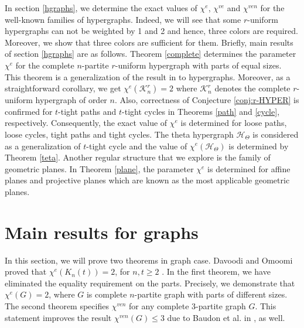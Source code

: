 \documentclass[12pt,a4paper]{article}
\begin{document}
In section \ref{hgraphs}, we determine the exact values of  $\chi^{e}$,  $\chi^{ve}$ and  $\chi^{ven}$ for the well-known  families of hypergraphs.  Indeed, we will see that some  $ r $-uniform hypergraphs can not be weighted by 1 and 2 and hence, three colors are required. Moreover, we show that three colors are sufficient for them.
Briefly,  main results of section  \ref{hgraphs} are as follows. Theorem \ref{complete} determines  the parameter $ \chi^{e}$ for the complete $ n$-partite $ r$-uniform hypergraph with parts of equal sizes. This theorem is a generalization of the result in \cite{DO} to hypergraphs. Moreover, as a straightforward corollary, we get $ \chi^{e}(\mathcal{K}_n^r)=2 $ where $\mathcal{K}_n^r$ denotes the complete  $ r$-uniform hypergraph of order $n$.
Also, correctness of Conjecture \ref{conj:r-HYPER} is confirmed for $t$-tight paths and $t$-tight cycles in Theorems \ref{path} and \ref{cycle}, respectively. Consequently, the exact value of $\chi^{e}$ is determined for loose paths, loose cycles, tight paths and tight cycles.
The theta hypergraph $\mathcal{H}_{\Theta}$ is considered as a generalization of $t$-tight cycle and the value of $\chi^{e}(\mathcal{H}_{\Theta})$ is determined by Theorem \ref{teta}.
Another regular structure that we explore is the family of geometric planes.  In Theorem \ref{plane}, the parameter $\chi^{e}$ is determined  for affine planes and projective planes which are known as the most applicable geometric planes.

\section{Main results for graphs\label{graph}}
In this section, we will prove two theorems in graph case.
Davoodi and Omoomi proved that $ \chi^{e}(K_n(t)) =2$, for $n,t \geq 2$ \cite{DO}. In the first theorem,  we have eliminated the equality requirement on the parts. Precisely,  we demonstrate that $ \chi^{e}(G) =2$, where $G$ is  complete $n$-partite graph with parts of  different sizes.
The second  theorem  specifies  $\chi^{ven}$ for any complete $ 3$-partite graph $G$. This statement improves the result $ \chi^{ven}(G)\leq 3$ due to Baudon et al. in  \cite{B}, as well.
\end{document}
